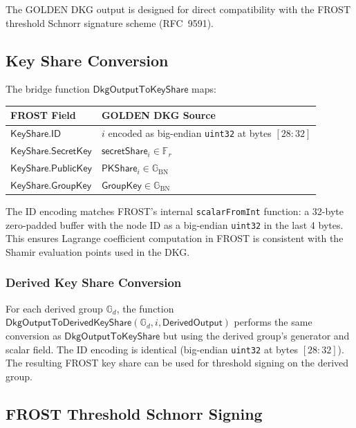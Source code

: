 \documentclass[11pt,a4paper]{article}
\newcommand{\F}{\mathbb{F}}
\newcommand{\G}{\mathbb{G}}
\newcommand{\Gbn}{\G_{\mathrm{BN}}}
\newcommand{\Fr}{\F_r}
\begin{document}
The GOLDEN DKG output is designed for direct compatibility with the FROST
threshold Schnorr signature scheme (RFC~9591).

\subsection{Key Share Conversion}
\label{sec:bridge}

The bridge function $\mathsf{DkgOutputToKeyShare}$ maps:

\begin{center}
\renewcommand{\arraystretch}{1.3}
\begin{tabular}{@{}ll@{}}
\toprule
\textbf{FROST Field} & \textbf{GOLDEN DKG Source} \\
\midrule
$\mathsf{KeyShare.ID}$ & $i$ encoded as big-endian \texttt{uint32} at bytes $[28{:}32]$ \\
$\mathsf{KeyShare.SecretKey}$ & $\mathsf{secretShare}_i \in \Fr$ \\
$\mathsf{KeyShare.PublicKey}$ & $\mathsf{PKShare}_i \in \Gbn$ \\
$\mathsf{KeyShare.GroupKey}$ & $\mathsf{GroupKey} \in \Gbn$ \\
\bottomrule
\end{tabular}
\end{center}

The ID encoding matches FROST's internal \texttt{scalarFromInt} function:
a 32-byte zero-padded buffer with the node ID as a big-endian \texttt{uint32}
in the last 4 bytes. This ensures Lagrange coefficient computation in FROST
is consistent with the Shamir evaluation points used in the DKG.

\subsubsection{Derived Key Share Conversion}
\label{sec:derived-bridge}

For each derived group $\G_d$, the function
$\mathsf{DkgOutputToDerivedKeyShare}(\G_d, i, \mathsf{DerivedOutput})$
performs the same conversion as $\mathsf{DkgOutputToKeyShare}$ but using the
derived group's generator and scalar field. The ID encoding is identical
(big-endian \texttt{uint32} at bytes $[28{:}32]$). The resulting FROST key
share can be used for threshold signing on the derived group.

\subsection{FROST Threshold Schnorr Signing}
\label{sec:frostsign}
\end{document}
